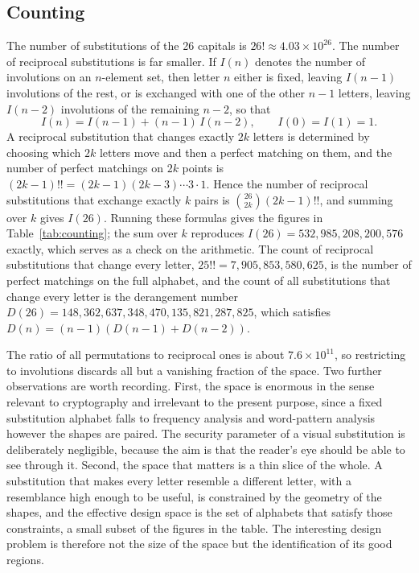 \subsection{Counting}

The number of substitutions of the 26 capitals is $26!\approx4.03\times10^{26}$. The number of reciprocal substitutions is far smaller. If $I(n)$ denotes the number of involutions on an $n$-element set, then letter $n$ either is fixed, leaving $I(n-1)$ involutions of the rest, or is exchanged with one of the other $n-1$ letters, leaving $I(n-2)$ involutions of the remaining $n-2$, so that
\[
I(n)=I(n-1)+(n-1)\,I(n-2),\qquad I(0)=I(1)=1.
\]
A reciprocal substitution that changes exactly $2k$ letters is determined by choosing which $2k$ letters move and then a perfect matching on them, and the number of perfect matchings on $2k$ points is $(2k-1)!!=(2k-1)(2k-3)\cdots 3\cdot 1$. Hence the number of reciprocal substitutions that exchange exactly $k$ pairs is $\binom{26}{2k}(2k-1)!!$, and summing over $k$ gives $I(26)$. Running these formulas gives the figures in Table~\ref{tab:counting}; the sum over $k$ reproduces $I(26)=532{,}985{,}208{,}200{,}576$ exactly, which serves as a check on the arithmetic. The count of reciprocal substitutions that change every letter, $25!!=7{,}905{,}853{,}580{,}625$, is the number of perfect matchings on the full alphabet, and the count of all substitutions that change every letter is the derangement number $D(26)=148{,}362{,}637{,}348{,}470{,}135{,}821{,}287{,}825$, which satisfies $D(n)=(n-1)(D(n-1)+D(n-2))$.

\begin{table}[ht]
\centering
\small

\caption{Reciprocal substitutions of the 26 Latin capitals by the number of exchanged pairs, with the totals for all reciprocal substitutions, all substitutions without fixed points, and all substitutions.}\label{tab:counting}
\end{table}

The ratio of all permutations to reciprocal ones is about $7.6\times10^{11}$, so restricting to involutions discards all but a vanishing fraction of the space. Two further observations are worth recording. First, the space is enormous in the sense relevant to cryptography and irrelevant to the present purpose, since a fixed substitution alphabet falls to frequency analysis and word-pattern analysis however the shapes are paired. The security parameter of a visual substitution is deliberately negligible, because the aim is that the reader's eye should be able to see through it. Second, the space that matters is a thin slice of the whole. A substitution that makes every letter resemble a different letter, with a resemblance high enough to be useful, is constrained by the geometry of the shapes, and the effective design space is the set of alphabets that satisfy those constraints, a small subset of the figures in the table. The interesting design problem is therefore not the size of the space but the identification of its good regions.

